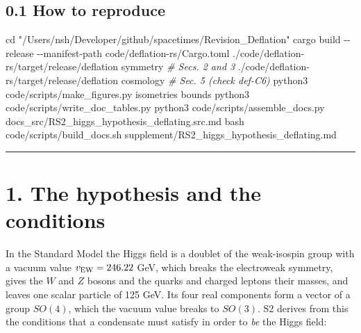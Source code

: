 \documentclass[
  10pt,
]{article}
\newenvironment{Shaded}{}{}
\newcommand{\AttributeTok}[1]{\textcolor[rgb]{0.49,0.56,0.16}{#1}}
\newcommand{\BuiltInTok}[1]{\textcolor[rgb]{0.00,0.50,0.00}{#1}}
\newcommand{\CommentTok}[1]{\textcolor[rgb]{0.38,0.63,0.69}{\textit{#1}}}
\newcommand{\ExtensionTok}[1]{#1}
\newcommand{\FunctionTok}[1]{\textcolor[rgb]{0.02,0.16,0.49}{#1}}
\newcommand{\NormalTok}[1]{#1}
\newcommand{\StringTok}[1]{\textcolor[rgb]{0.25,0.44,0.63}{#1}}
\begin{document}
\hypertarget{how-to-reproduce}{%
\subsection{0.1 How to reproduce}\label{how-to-reproduce}}

\begin{Shaded}
\begin{Highlighting}[]
\BuiltInTok{cd} \StringTok{"/Users/nsh/Developer/github/spacetimes/Revision\_Deflation"}
\ExtensionTok{cargo}\NormalTok{ build }\AttributeTok{{-}{-}release} \AttributeTok{{-}{-}manifest{-}path}\NormalTok{ code/deflation{-}rs/Cargo.toml}
\ExtensionTok{./code/deflation{-}rs/target/release/deflation}\NormalTok{ symmetry    }\CommentTok{\# Secs. 2 and 3}
\ExtensionTok{./code/deflation{-}rs/target/release/deflation}\NormalTok{ cosmology   }\CommentTok{\# Sec. 5 (check def{-}C6)}
\ExtensionTok{python3}\NormalTok{ code/scripts/make\_figures.py isometries bounds}
\ExtensionTok{python3}\NormalTok{ code/scripts/write\_doc\_tables.py}
\ExtensionTok{python3}\NormalTok{ code/scripts/assemble\_docs.py docs\_src/RS2\_higgs\_hypothesis\_deflating.src.md}
\FunctionTok{bash}\NormalTok{ code/scripts/build\_docs.sh supplement/RS2\_higgs\_hypothesis\_deflating.md}
\end{Highlighting}
\end{Shaded}

\begin{center}\rule{0.5\linewidth}{0.5pt}\end{center}

\hypertarget{the-hypothesis-and-the-conditions}{%
\section{1. The hypothesis and the
conditions}\label{the-hypothesis-and-the-conditions}}

In the Standard Model the Higgs field is a doublet of the weak-isospin
group with a vacuum value \(v_{\rm EW}=246.22\) GeV, which breaks the
electroweak symmetry, gives the \(W\) and \(Z\) bosons and the quarks
and charged leptons their masses, and leaves one scalar particle of 125
GeV. Its four real components form a vector of a group \(SO(4)\), which
the vacuum value breaks to \(SO(3)\). S2 derives from this the
conditions that a condensate must satisfy in order to \emph{be} the
Higgs field:
\end{document}
